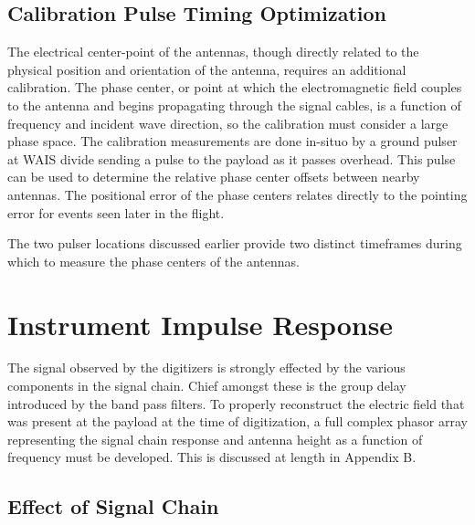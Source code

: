		
	\subsection{Calibration Pulse Timing Optimization}
		The electrical center-point of the antennas, though directly related to the physical position and orientation of the antenna, requires an additional calibration.  The phase center, or point at which the electromagnetic field couples to the antenna and begins propagating through the signal cables, is a function of frequency and incident wave direction, so the calibration must consider a large phase space.  The calibration measurements are done in-situo by a ground pulser at WAIS divide sending a pulse to the payload as it passes overhead.  This pulse can be used to determine  the relative phase center offsets between nearby antennas.  The positional error of the phase centers relates directly to the pointing error for events seen later in the flight.
		
		The two pulser locations discussed earlier provide two distinct timeframes during which to measure the phase centers of the antennas.  

\section{Instrument Impulse Response}
		The signal observed by the digitizers is strongly effected by the various components in the signal chain.  Chief amongst these is the group delay introduced by the band pass filters.  To properly reconstruct the electric field that was present at the payload at the time of digitization, a full complex phasor array representing the signal chain response and antenna height as a function of frequency must be developed.  This is discussed at length in Appendix B.
		
	\subsection{Effect of Signal Chain}
	
